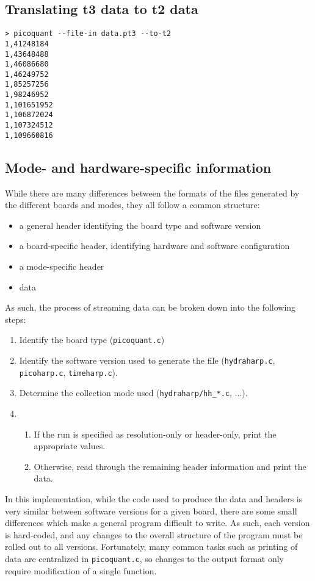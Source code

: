 \documentclass{article}
\begin{document}
\subsection{Translating t3 data to t2 data}
\begin{verbatim}
> picoquant --file-in data.pt3 --to-t2
1,41248184
1,43648488
1,46086680
1,46249752
1,85257256
1,98246952
1,101651952
1,106872024
1,107324512
1,109660816
\end{verbatim}

\subsection{Mode- and hardware-specific information}
\label{sec:formats}

While there are many differences between the formats of the files generated by the different boards and modes, they all follow a common structure:
\begin{itemize}
\item a general header identifying the board type and software version
\item a board-specific header, identifying hardware and software configuration
\item a mode-specific header
\item data
\end{itemize}

As such, the process of streaming data can be broken down into the following steps:
\begin{enumerate}
\item Identify the board type (\texttt{picoquant.c})
\item Identify the software version used to generate the file (\texttt{hydraharp.c}, \texttt{picoharp.c}, \texttt{timeharp.c}).
\item Determine the collection mode used (\texttt{hydraharp/hh\_*.c}, $\ldots$).
\item  \begin{enumerate}
  \item If the run is specified as resolution-only or header-only, print the appropriate values.
  \item Otherwise, read through the remaining header information and print the data.
  \end{enumerate}
\end{enumerate}

In this implementation, while the code used to produce the data and headers is very similar between software versions for a given board, there are some small differences which make a general program difficult to write. As such, each version is hard-coded, and any changes to the overall structure of the program must be rolled out to all versions. Fortunately, many common tasks such as printing of data are centralized in \texttt{picoquant.c}, so changes to the output format only require modification of a single function.
\end{document}
